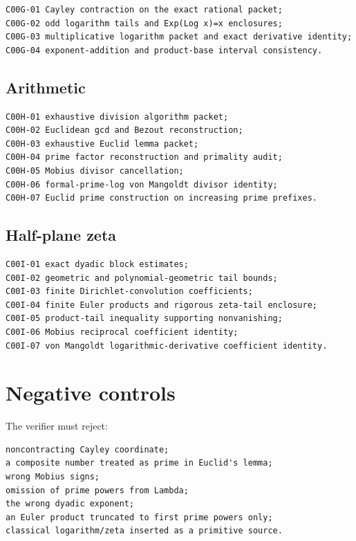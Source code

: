 \begin{verbatim}
C00G-01 Cayley contraction on the exact rational packet;
C00G-02 odd logarithm tails and Exp(Log x)=x enclosures;
C00G-03 multiplicative logarithm packet and exact derivative identity;
C00G-04 exponent-addition and product-base interval consistency.
\end{verbatim}

\hypertarget{arithmetic-1}{%
\subsection{Arithmetic}\label{arithmetic-1}}

\begin{verbatim}
C00H-01 exhaustive division algorithm packet;
C00H-02 Euclidean gcd and Bezout reconstruction;
C00H-03 exhaustive Euclid lemma packet;
C00H-04 prime factor reconstruction and primality audit;
C00H-05 Mobius divisor cancellation;
C00H-06 formal-prime-log von Mangoldt divisor identity;
C00H-07 Euclid prime construction on increasing prime prefixes.
\end{verbatim}

\hypertarget{half-plane-zeta}{%
\subsection{Half-plane zeta}\label{half-plane-zeta}}

\begin{verbatim}
C00I-01 exact dyadic block estimates;
C00I-02 geometric and polynomial-geometric tail bounds;
C00I-03 finite Dirichlet-convolution coefficients;
C00I-04 finite Euler products and rigorous zeta-tail enclosure;
C00I-05 product-tail inequality supporting nonvanishing;
C00I-06 Mobius reciprocal coefficient identity;
C00I-07 von Mangoldt logarithmic-derivative coefficient identity.
\end{verbatim}

\hypertarget{negative-controls}{%
\section{Negative controls}\label{negative-controls}}

The verifier must reject:

\begin{verbatim}
noncontracting Cayley coordinate;
a composite number treated as prime in Euclid's lemma;
wrong Mobius signs;
omission of prime powers from Lambda;
the wrong dyadic exponent;
an Euler product truncated to first prime powers only;
classical logarithm/zeta inserted as a primitive source.
\end{verbatim}

